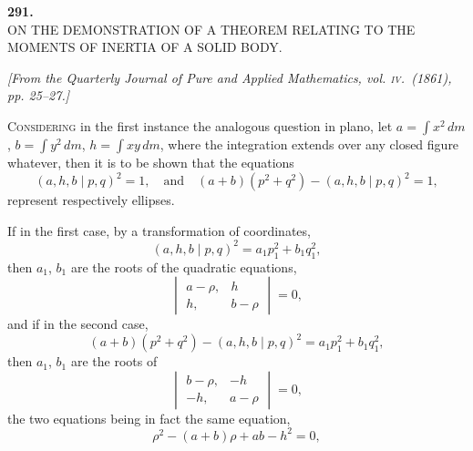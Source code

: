 \documentclass[11pt]{article}
\begin{document}
\bigskip

\begin{center}
\textbf{\large 291.}\\[1ex]
\textsc{ON THE DEMONSTRATION OF A THEOREM RELATING TO THE\\
MOMENTS OF INERTIA OF A SOLID BODY.}
\end{center}

\begin{center}
\textit{[From the Quarterly Journal of Pure and Applied Mathematics, vol. \textsc{iv}.\ (1861),
pp. 25--27.]}
\end{center}

\medskip

\textsc{Considering} in the first instance the analogous question in plano, let
$a=\int x^{2}\,dm$, $b=\int y^{2}\,dm$, $h=\int xy\,dm$, where the integration extends over any closed
figure whatever, then it is to be shown that the equations
\[ (a,h,b\mid p,q)^{2}=1,\quad \text{and}\quad (a+b)(p^{2}+q^{2})-(a,h,b\mid p,q)^{2}=1, \]
represent respectively ellipses.

\smallskip

If in the first case, by a transformation of coordinates,
\[ (a,h,b\mid p,q)^{2}=a_{1}p_{1}^{2}+b_{1}q_{1}^{2}, \]
then $a_{1}$, $b_{1}$ are the roots of the quadratic equations,
\[ \begin{vmatrix} a-\rho, & h \\ h, & b-\rho \end{vmatrix}=0, \]
and if in the second case,
\[ (a+b)(p^{2}+q^{2})-(a,h,b\mid p,q)^{2}=a_{1}p_{1}^{2}+b_{1}q_{1}^{2}, \]
then $a_{1}$, $b_{1}$ are the roots of
\[ \begin{vmatrix} b-\rho, & -h \\ -h, & a-\rho \end{vmatrix}=0, \]
the two equations being in fact the same equation,
\[ \rho^{2}-(a+b)\rho+ab-h^{2}=0, \]
\end{document}
